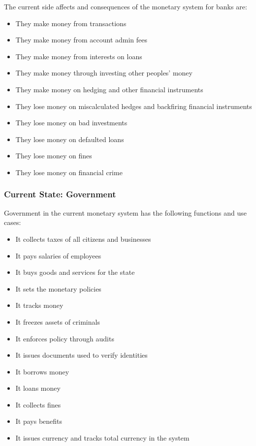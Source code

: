 \documentclass[a4paper,12pt]{article} %
\begin{document}
{The current side affects and consequences of the monetary system for banks are:

\begin{itemize}
	\item They make money from transactions
	\item They make money from account admin fees
	\item They make money from interests on loans
	\item They make money through investing other peoples' money
	\item They make money on hedging and other financial instruments
	\item They lose money on miscalculated hedges and backfiring financial instruments
	\item They lose money on bad investments
	\item They lose money on defaulted loans
	\item They lose money on fines
	\item They lose money on financial crime
\end{itemize}

\subsubsection{Current State: Government} \label{sssec:4.3:government}

Government in the current monetary system has the following functions and use cases:

\begin{itemize}
	\item It collects taxes of all citizens and businesses
	\item It pays salaries of employees
	\item It buys goods and services for the state
	\item It sets the monetary policies
	\item It tracks money
	\item It freezes assets of criminals
	\item It enforces policy through audits
	\item It issues documents used to verify identities
	\item It borrows money
	\item It loans money
	\item It collects fines
	\item It pays benefits
	\item It issues currency and tracks total currency in the system
\end{itemize}

}
\end{document}
